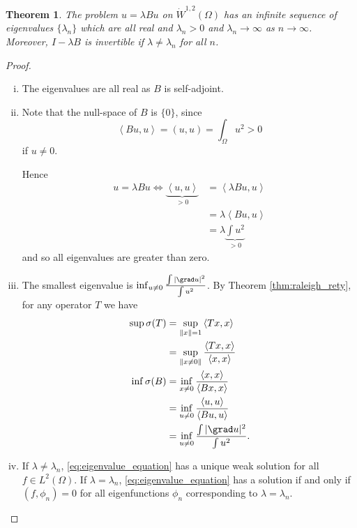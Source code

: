 \documentclass[10pt, oneside, reqno]{amsart}
\theoremstyle{plain}%
\newtheorem{thm}{Theorem}[section]
\numberwithin{equation}{section}
\theoremstyle{definition}
\theoremstyle{remark}
\newcommand{\iprod}[1]{\left\langle #1 \right\rangle}
\begin{document}
\begin{thm}
    The problem $u = \lambda B u $ on $\dot W^{1, 2}(\Omega)$ has an infinite sequence of eigenvalues $\{ \lambda_n \}$ which are all real and $\lambda_n > 0$ and $\lambda_n \rightarrow \infty$ as $n \rightarrow \infty$.  Moreover, $I- \lambda B$ is invertible if $\lambda \neq \lambda_n$ for all $n$.
\end{thm}
\begin{proof}{\ }
    
\begin{enumerate}[(i)]
    \item The eigenvalues are all real as $B$ is self-adjoint.
    \item
    Note that the null-space of $B$ is $\{ 0 \}$, since \[
        \iprod{Bu, u} = (u, u) = \int_\Omega u^2 > 0
    \] if $u \neq 0$.  
    
    Hence \begin{align*}
        u = \lambda Bu \iff \underbrace{\iprod{u, u}}_{> 0} &= \iprod{\lambda Bu, u} \\
                                        &= \lambda \iprod{Bu, u} \\
                                        &= \lambda \underbrace{\int u^2}_{> 0}
    \end{align*} and so all eigenvalues are greater than zero.
    
    \item 
        The smallest eigenvalue is $\inf_{u \neq 0} \frac {\int |\grad u |^2}{\int u^2}$. By Theorem \ref{thm:raleigh_rety}, for any operator $T$ we have \begin{align*}
            \sup \sigma(T)  &= \sup_{\| x \| = 1} \iprod{Tx, x} \\
                            &= \sup_{\| x \neq 0 \|} \frac{\iprod{Tx, x}}{\iprod{x, x}} \\
                            \inf \sigma(B) &= \inf_{x \neq 0} \frac{\iprod{x, x}}{\iprod{Bx, x}} \\
                            &= \inf_{u \neq 0} \frac{\iprod{u, u}}{\iprod{Bu, u}}  \\
                            &= \inf_{u \neq 0} \frac{\int |\grad u |^2}{\int u^2}.
        \end{align*} 
    \item If $\lambda \neq \lambda_n$, \eqref{eq:eigenvalue_equation} has a unique weak solution for all $f \in L^2(\Omega)$.  If $\lambda = \lambda_n$, \eqref{eq:eigenvalue_equation} has a solution if and only if $(f, \phi_n) = 0$ for all eigenfunctions $\phi_n$ corresponding to $\lambda = \lambda_n$.
    

\end{enumerate}
\end{proof}
\end{document}

